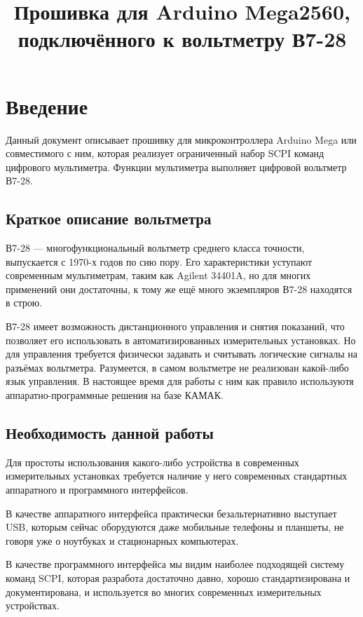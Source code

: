 \documentclass[10pt, a4paper, twocolumn]{article}
\title{Прошивка для Arduino Mega2560, подключённого к вольтметру В7-28}
\newcommand{\SCPI}{\mbox{SCPI}}
\newcommand{\V}{\mbox{В7-28}}
\begin{document}
\maketitle

\section{Введение}

Данный документ описывает прошивку для микроконтроллера Arduino Mega или совместимого с ним, которая реализует ограниченный набор \SCPI{} команд цифрового мультиметра. Функции мультиметра выполняет цифровой вольтметр \V.

\subsection{Краткое описание вольтметра}

\V{} --- многофункциональный вольтметр среднего класса точности, выпускается с 1970-х годов по сию пору. Его характеристики уступают современным мультиметрам, таким как Agilent \mbox{34401A}, но для многих применений они достаточны, к тому же ещё много экземпляров \V{} находятся в строю.

\V{} имеет возможность дистанционного управления и снятия показаний, что позволяет его использовать в автоматизированных измерительных установках. Но для управления требуется физически задавать и считывать логические сигналы на разъёмах вольтметра. Разумеется, в самом вольтметре не реализован какой-либо язык управления. В настоящее время для работы с ним как правило используютя аппаратно-программные решения на базе КАМАК.

\subsection{Необходимость данной работы}

Для простоты использования какого-либо устройства в современных измерительных установках требуется наличие у него современных стандартных аппаратного и программного интерфейсов.

В качестве аппаратного интерфейса практически безальтернативно выступает USB, которым сейчас оборудуются даже мобильные телефоны и планшеты, не говоря уже о ноутбуках и стационарных компьютерах.

В качестве программного интерфейса мы видим наиболее подходящей систему команд \SCPI, которая разработа достаточно давно, хорошо стандартизирована и документирована, и используется во многих современных измерительных устройствах.
\end{document}
